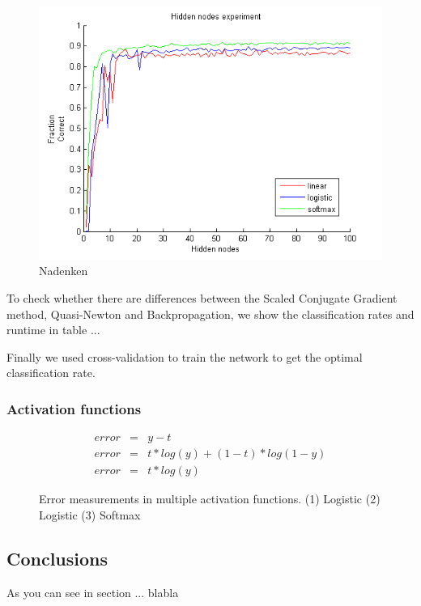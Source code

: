 \documentclass{article}
\begin{document}
\begin{figure}[H]
	\centering
		\includegraphics[width=\textwidth]{hidden_nodes.png}
    \caption{Nadenken}
    \label{fig:hidden_nodes}
\end{figure}

To check whether there are differences between the Scaled Conjugate Gradient method, Quasi-Newton and Backpropagation, we show the classification rates and runtime in table ...

Finally we used cross-validation to train the network to get the optimal classification rate.

\subsubsection{Activation functions}
\begin{figure}[H]
	\centering
	\begin{eqnarray}
		error & = & y - t \\
		error & = & t * log(y) + (1 - t) * log(1 - y) \\
		error & = & t * log(y)
	\end{eqnarray}
	\caption{Error measurements in multiple activation functions. (1) Logistic (2) Logistic (3) Softmax }
\end{figure}

\subsection{Conclusions}
As you can see in section ... blabla
\end{document}
